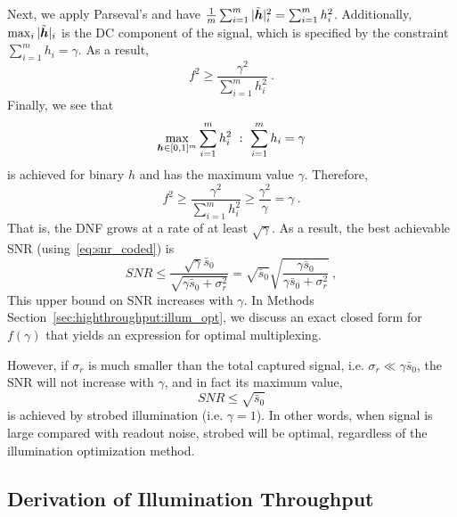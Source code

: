 Next, we apply Parseval's and have $\frac{1}{m}\sum_{i=1}^m |\tilde {\bm{h}}|_i^2 = \sum_{i=1}^m h_i^2$.
Additionally, $\max_i |\tilde {\bm{h}}|_i$ is the DC component of the signal, which is specified by the constraint $\sum_{i=1}^m h_i = \gamma$.
As a result, $$ f^2 \geq \frac{\gamma^2}{\sum_{i=1}^m h_i^2}\:.$$
Finally, we see that
$$\max_{\bm{h}\in[0,1]^m} \sum_{i=1}^m h_i^2~:~ \sum_{i=1}^m h_i=\gamma$$
is achieved for binary $h$ and has the maximum value $\gamma$. Therefore,
\[f^2 \geq \frac{\gamma^2}{\sum_{i=1}^m h_i^2} \geq \frac{\gamma^2}{\gamma} = \gamma\:.\]
That is, the DNF grows at a rate of at least $\sqrt{\gamma}$. As a result,  the best achievable SNR (using~\eqref{eq:snr_coded}) is
$$ SNR  \leq \frac{\sqrt{\gamma}\bar{s}_0}{\sqrt{\gamma\bar{s}_0 + \sigma^2_{r}}}
=\sqrt{\bar{s}_0}\sqrt{\frac{\gamma \bar{s}_0 }{\gamma\bar{s}_0 + \sigma^2_{r}}}\:,
$$
This upper bound on SNR increases with ${\gamma}$.
In Methods Section~\ref{sec:highthroughput:illum_opt}, we discuss an exact closed form for $f(\gamma)$ that yields an expression for optimal multiplexing.

However, if $\sigma_r$ is much smaller than the total captured signal, i.e. $\sigma_r \ll \gamma \bar{s}_0 $, the SNR will not increase with $\gamma$, and in fact its maximum value,
$$SNR \leq \sqrt{\bar{s}_0}$$
is achieved by strobed illumination (i.e. $\gamma=1$). In other words, when signal is large compared with readout noise, strobed will be optimal, regardless of the illumination optimization method.


\subsection{Derivation of Illumination Throughput}\label{sec:appendix:app_throughput}

